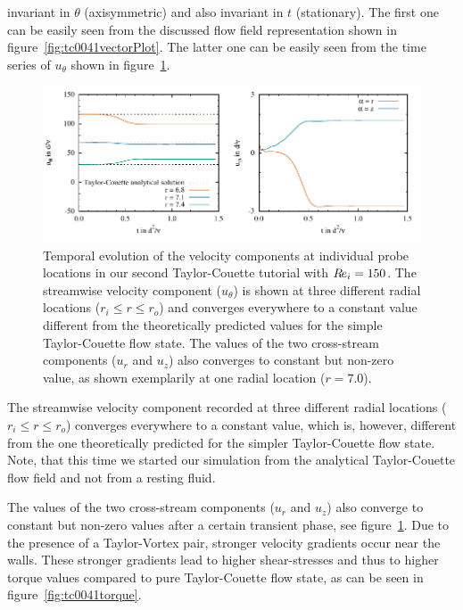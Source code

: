 \documentclass[a4paper, 11pt, DIV=11]{scrartcl}
\begin{document}
invariant in $\theta$ (axisymmetric) and also invariant in $t$ (stationary). The
first one can be easily seen from the discussed flow field representation shown
in figure~\ref{fig:tc0041vectorPlot}. The latter one can be easily seen from the
time series of $u_{\theta}$ shown in figure~\ref{fig:tc0041probes}.
\begin{figure}[htb]
\centering
\includegraphics[scale=1.00]{figures/tc0041/probes}
\caption{Temporal evolution of the velocity components at individual probe 
locations in our second Taylor-Couette tutorial  with $R\hspace{-0.1em}e_{i}=\num{150}$.
The streamwise velocity component ($u_{\theta}$) is shown 
at three different radial locations ($r_{i}\le r\le r_{o}$) and converges 
everywhere to a constant value different from the theoretically predicted values for
the simple Taylor-Couette flow state. The values of the two cross-stream components
($u_r$ and $u_z$) also converges to constant but non-zero value, as shown exemplarily
at one radial location ($r=\num{7.0}$).}
\label{fig:tc0041probes}
\end{figure}
The streamwise velocity component recorded at three different radial
locations ($r_{i}\le r\le r_{o}$) converges everywhere to a constant
value, which is, however, different from the one theoretically predicted
for the simpler Taylor-Couette flow state. Note, that this time we
started our simulation from the analytical Taylor-Couette flow field
and not from a resting fluid.
\par
The values of the two cross-stream components ($u_r$ and $u_z$) also converge to constant
but non-zero values after a certain transient phase, see figure~\ref{fig:tc0041probes}. Due
to the presence of a Taylor-Vortex pair, stronger velocity gradients occur near the walls.
These stronger gradients lead to higher shear-stresses and thus to higher torque values
compared to pure Taylor-Couette flow state, as can be seen in figure~\ref{fig:tc0041torque}.
\end{document}

